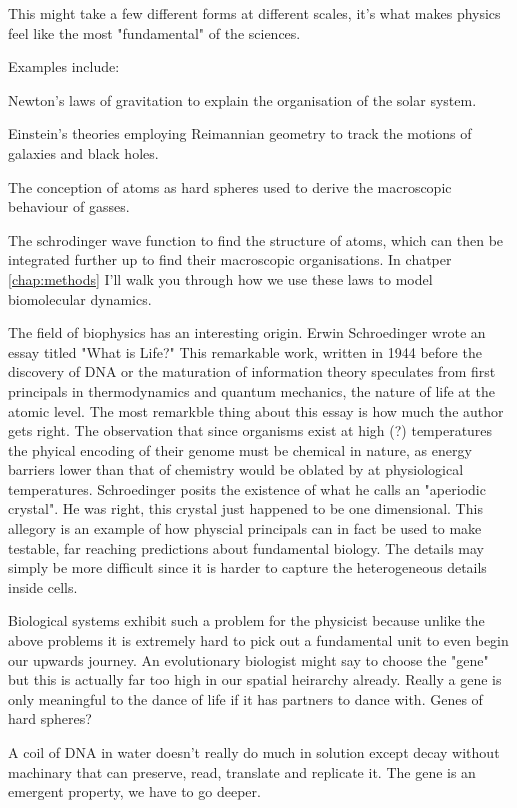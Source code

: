 This might take a few different forms at different scales, it's what makes physics feel like the most "fundamental" of the sciences. 

Examples include:

Newton's laws of gravitation to explain the organisation of the solar system. 

Einstein's theories employing Reimannian geometry to track the motions of galaxies and black holes.

The conception of atoms as hard spheres used to derive the macroscopic behaviour of gasses.

The schrodinger wave function to find the structure of atoms, which can then be integrated further up to find their macroscopic organisations. In chatper \ref{chap:methods} I'll walk you through how we use these laws to model biomolecular dynamics.  

The field of biophysics has an interesting origin. Erwin Schroedinger wrote an essay titled "What is Life?" This remarkable work, written in  1944 before the discovery of DNA or the maturation of information theory speculates from first principals in thermodynamics and quantum mechanics, the nature of life at the atomic level. The most remarkble thing about this essay is how much the author gets right. The observation that since organisms exist at high (?) temperatures the phyical encoding of their genome must be chemical in nature, as energy barriers lower than that of chemistry would be oblated by at physiological temperatures. Schroedinger posits the existence of what he  calls an "aperiodic crystal". He was right, this crystal just happened to be one dimensional. This allegory is an example of how physcial principals can in fact be used to make testable, far reaching predictions about fundamental biology. The details may simply be more difficult since it is harder to capture the heterogeneous details inside cells.

Biological systems exhibit such a problem for the physicist because unlike the above problems it is extremely hard to pick out a fundamental unit to even begin our upwards journey. An evolutionary biologist might say to choose the "gene" but this is actually far too high in our spatial heirarchy already. Really a gene is only meaningful to the dance of life if it has partners to dance with. Genes of hard spheres?

A coil of DNA in water doesn't really do much in solution except decay without machinary that can preserve, read, translate and replicate it. The gene is an emergent property, we have to go deeper. 

